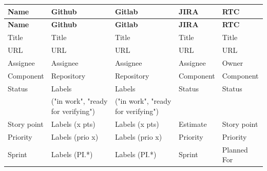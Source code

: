 \begin{longtable}{|l|l|l|l|l|}
   \hline
   \textbf{Name} & \textbf{Github} & \textbf{Gitlab} & \textbf{JIRA} & \textbf{RTC} \\
   \hline
   \endfirsthead

   \hline
   \textbf{Name} & \textbf{Github} & \textbf{Gitlab} & \textbf{JIRA} & \textbf{RTC} \\
   \hline
   \endhead

   Title & Title & Title & Title & Title \\
   \hline
   URL & URL & URL & URL & URL \\
   \hline
   Assignee & Assignee & Assignee & Assignee & Owner \\
   \hline
   Component & Repository & Repository & Component & Component \\
   \hline
   Status & Labels & Labels & Status & Status \\
   & ("in work", "ready for verifying") & ("in work", "ready for verifying") & & \\
   \hline
   Story point & Labels (x pts) & Labels (x pts) & Estimate & Story point \\
   \hline
   Priority & Labels (prio x) & Labels (prio x) & Priority & Priority \\
   \hline
   Sprint & Labels (PI.*) & Labels (PI.*) & Sprint & Planned For \\
   \hline
\end{longtable}